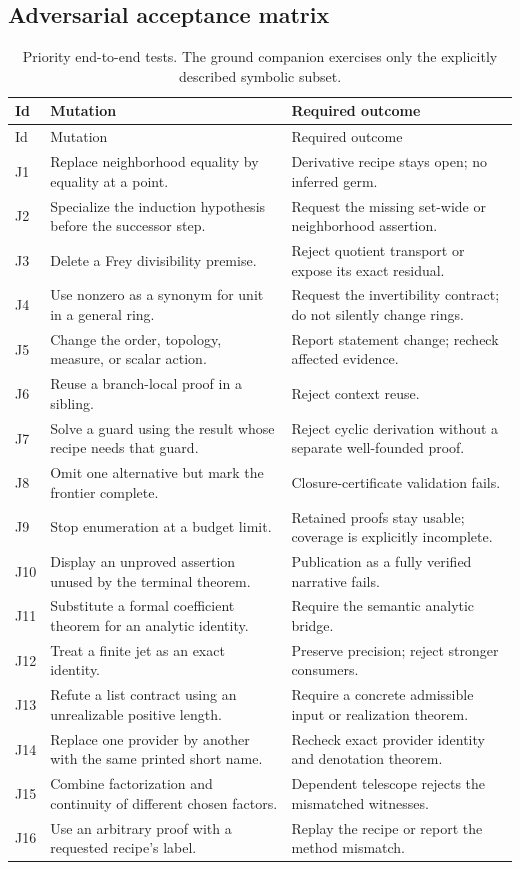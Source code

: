 \documentclass[11pt,a4paper]{article}
\theoremstyle{definition}\newtheorem{definition}[theorem]{Definition}
\theoremstyle{remark}\newtheorem{remark}[theorem]{Remark}
\begin{document}
\subsection{Adversarial acceptance matrix}
\begin{longtable}{@{}L{11mm}L{66mm}L{73mm}@{}}
\caption{Priority end-to-end tests. The ground companion exercises only the explicitly described symbolic subset.}\label{tab:adversarial}\\
\toprule Id & Mutation & Required outcome\\\midrule\endfirsthead
\toprule Id & Mutation & Required outcome\\\midrule\endhead
\bottomrule\endfoot
J1 & Replace neighborhood equality by equality at a point. & Derivative recipe stays open; no inferred germ.\\
J2 & Specialize the induction hypothesis before the successor step. & Request the missing set-wide or neighborhood assertion.\\
J3 & Delete a Frey divisibility premise. & Reject quotient transport or expose its exact residual.\\
J4 & Use nonzero as a synonym for unit in a general ring. & Request the invertibility contract; do not silently change rings.\\
J5 & Change the order, topology, measure, or scalar action. & Report statement change; recheck affected evidence.\\
J6 & Reuse a branch-local proof in a sibling. & Reject context reuse.\\
J7 & Solve a guard using the result whose recipe needs that guard. & Reject cyclic derivation without a separate well-founded proof.\\
J8 & Omit one alternative but mark the frontier complete. & Closure-certificate validation fails.\\
J9 & Stop enumeration at a budget limit. & Retained proofs stay usable; coverage is explicitly incomplete.\\
J10 & Display an unproved assertion unused by the terminal theorem. & Publication as a fully verified narrative fails.\\
J11 & Substitute a formal coefficient theorem for an analytic identity. & Require the semantic analytic bridge.\\
J12 & Treat a finite jet as an exact identity. & Preserve precision; reject stronger consumers.\\
J13 & Refute a list contract using an unrealizable positive length. & Require a concrete admissible input or realization theorem.\\
J14 & Replace one provider by another with the same printed short name. & Recheck exact provider identity and denotation theorem.\\
J15 & Combine factorization and continuity of different chosen factors. & Dependent telescope rejects the mismatched witnesses.\\
J16 & Use an arbitrary proof with a requested recipe's label. & Replay the recipe or report the method mismatch.\\
\end{longtable}
\end{document}

